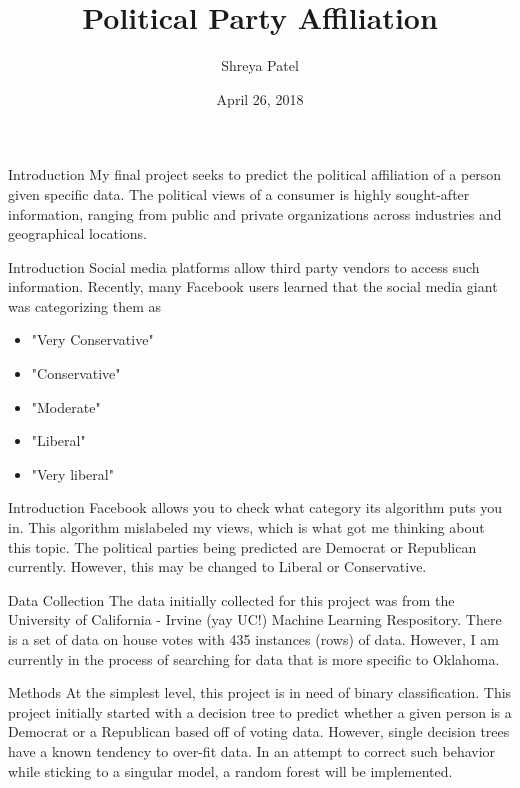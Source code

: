 \documentclass[10pt]{beamer}
\title{Political Party Affiliation}
\subtitle{ }
\date{April 26, 2018}
\author{Shreya Patel}
\institute{Data Science for Economists}
\begin{document}
\maketitle


\begin{frame}[fragile]{Introduction}
  My final project seeks to predict the political affiliation of a person given specific data. The political views of a consumer is highly sought-after information, ranging from public and private organizations across industries and geographical locations.
\end{frame}

\begin{frame}[fragile]{Introduction}
  Social media platforms allow third party vendors to access such information. Recently, many Facebook users learned that the social media giant was categorizing them as
  \begin{itemize}
      \item "Very Conservative"
      \item "Conservative"
      \item "Moderate"
      \item "Liberal"
      \item "Very liberal"
  \end{itemize}
\end{frame}

\begin{frame}[fragile]{Introduction}
    Facebook allows you to check what category its algorithm puts you in. This algorithm mislabeled my views, which is what got me thinking about this topic. The political parties being predicted are Democrat or Republican currently. However, this may be changed to Liberal or Conservative.
\end{frame}

\begin{frame}{Data Collection}
	The data initially collected for this project was from the University of California - Irvine (yay UC!) Machine Learning Respository. There is a set of data on house votes with 435 instances (rows) of data. However, I am currently in the process of searching for data that is more specific to Oklahoma.
\end{frame}


\begin{frame}[fragile]{Methods}
      At the simplest level, this project is in need of binary classification. This project initially started with a decision tree to predict whether a given person is a Democrat or a Republican based off of voting data. However, single decision trees have a known tendency to over-fit data. In an attempt to correct such behavior while sticking to a singular model, a random forest will be implemented.
\end{frame}
\end{document}

